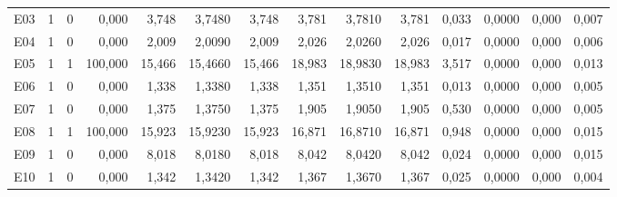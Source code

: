 \begin{singlespace}
\begin{longtable}{@{}lrrrrrrrrrrrrr@{}}
E03 & 1 & 0 & 0{,}000 & 3{,}748 & 3{,}7480 & 3{,}748 & 3{,}781 & 3{,}7810 & 3{,}781 & 0{,}033 & 0{,}0000 & 0{,}000 & 0{,}007\\
E04 & 1 & 0 & 0{,}000 & 2{,}009 & 2{,}0090 & 2{,}009 & 2{,}026 & 2{,}0260 & 2{,}026 & 0{,}017 & 0{,}0000 & 0{,}000 & 0{,}006\\
E05 & 1 & 1 & 100{,}000 & 15{,}466 & 15{,}4660 & 15{,}466 & 18{,}983 & 18{,}9830 & 18{,}983 & 3{,}517 & 0{,}0000 & 0{,}000 & 0{,}013\\
E06 & 1 & 0 & 0{,}000 & 1{,}338 & 1{,}3380 & 1{,}338 & 1{,}351 & 1{,}3510 & 1{,}351 & 0{,}013 & 0{,}0000 & 0{,}000 & 0{,}005\\
E07 & 1 & 0 & 0{,}000 & 1{,}375 & 1{,}3750 & 1{,}375 & 1{,}905 & 1{,}9050 & 1{,}905 & 0{,}530 & 0{,}0000 & 0{,}000 & 0{,}005\\
E08 & 1 & 1 & 100{,}000 & 15{,}923 & 15{,}9230 & 15{,}923 & 16{,}871 & 16{,}8710 & 16{,}871 & 0{,}948 & 0{,}0000 & 0{,}000 & 0{,}015\\
E09 & 1 & 0 & 0{,}000 & 8{,}018 & 8{,}0180 & 8{,}018 & 8{,}042 & 8{,}0420 & 8{,}042 & 0{,}024 & 0{,}0000 & 0{,}000 & 0{,}015\\
E10 & 1 & 0 & 0{,}000 & 1{,}342 & 1{,}3420 & 1{,}342 & 1{,}367 & 1{,}3670 & 1{,}367 & 0{,}025 & 0{,}0000 & 0{,}000 & 0{,}004\\
\end{longtable}
\endgroup
{}
\end{singlespace}
